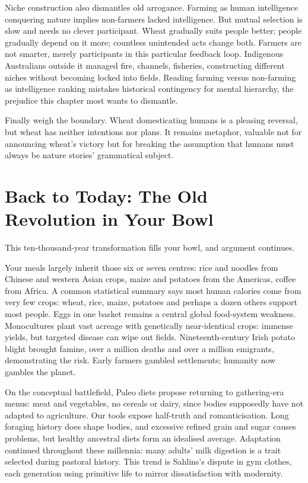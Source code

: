 Niche construction also dismantles old arrogance. Farming as human intelligence conquering nature implies non-farmers lacked intelligence. But mutual selection is slow and needs no clever participant. Wheat gradually suits people better; people gradually depend on it more; countless unintended acts change both. Farmers are not smarter, merely participants in this particular feedback loop. Indigenous Australians outside it managed fire, channels, fisheries, constructing different niches without becoming locked into fields. Reading farming versus non-farming as intelligence ranking mistakes historical contingency for mental hierarchy, the prejudice this chapter most wants to dismantle.

Finally weigh the boundary. Wheat domesticating humans is a pleasing reversal, but wheat has neither intentions nor plans. It remains metaphor, valuable not for announcing wheat's victory but for breaking the assumption that humans must always be nature stories' grammatical subject.

\section[Today: The Old Revolution in Your Bowl]{Back to Today: The Old Revolution in Your Bowl}
This ten-thousand-year transformation fills your bowl, and argument continues.

Your meals largely inherit those six or seven centres: rice and noodles from Chinese and western Asian crops, maize and potatoes from the Americas, coffee from Africa. A common statistical summary says most human calories come from very few crops: wheat, rice, maize, potatoes and perhaps a dozen others support most people. Eggs in one basket remains a central global food-system weakness. Monocultures plant vast acreage with genetically near-identical crops: immense yields, but targeted disease can wipe out fields. Nineteenth-century Irish potato blight brought famine, over a million deaths and over a million emigrants, demonstrating the risk. Early farmers gambled settlements; humanity now gambles the planet.

On the conceptual battlefield, Paleo diets propose returning to gathering-era menus: meat and vegetables, no cereals or dairy, since bodies supposedly have not adapted to agriculture. Our tools expose half-truth and romanticisation. Long foraging history does shape bodies, and excessive refined grain and sugar causes problems, but healthy ancestral diets form an idealised average. Adaptation continued throughout these millennia: many adults' milk digestion is a trait selected during pastoral history. This trend is Sahlins's dispute in gym clothes, each generation using primitive life to mirror dissatisfaction with modernity.

